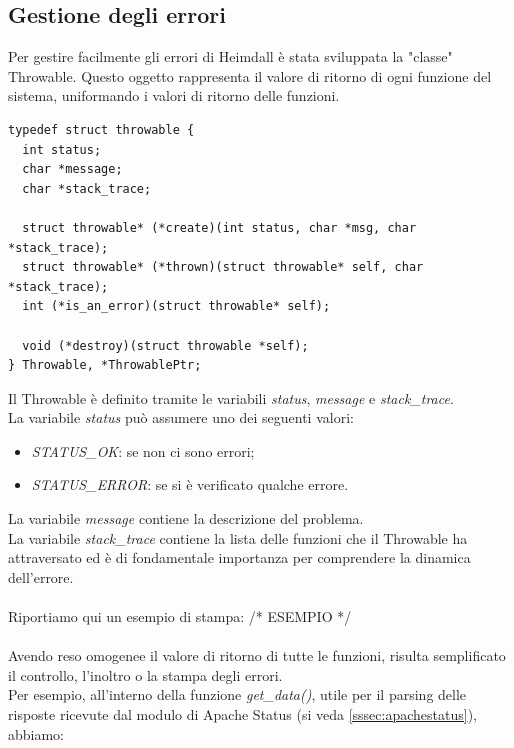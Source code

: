 \documentclass[italian]{tktltiki2}
\begin{document}
\subsection{Gestione degli errori}
\label{sec:errors}
Per gestire facilmente gli errori di Heimdall è stata sviluppata la "classe" Throwable.
Questo oggetto rappresenta il valore di ritorno di ogni funzione del sistema, uniformando i valori di ritorno delle funzioni.
\begin{lstlisting}
typedef struct throwable {
  int status;
  char *message;
  char *stack_trace;

  struct throwable* (*create)(int status, char *msg, char *stack_trace);
  struct throwable* (*thrown)(struct throwable* self, char *stack_trace);
  int (*is_an_error)(struct throwable* self);
  
  void (*destroy)(struct throwable *self);
} Throwable, *ThrowablePtr;
\end{lstlisting} 
Il Throwable è definito tramite le variabili \emph{status}, \emph{message} e \emph{stack\_trace}.
\\
La variabile \emph{status} può assumere uno dei seguenti valori:
\begin{itemize}
  \item \emph{STATUS\_OK}: se non ci sono errori;
  \item \emph{STATUS\_ERROR}: se si è verificato qualche errore.
\end{itemize}
La variabile \emph{message} contiene la descrizione del problema.
\\
La variabile \emph{stack\_trace} contiene la lista delle funzioni che il Throwable ha attraversato ed è di fondamentale importanza per comprendere la dinamica dell'errore.
\\\\
Riportiamo qui un esempio di stampa:
/* ESEMPIO */
\\\\
Avendo reso omogenee il valore di ritorno di tutte le funzioni, risulta semplificato il controllo, l'inoltro o la stampa degli errori.
\\
Per esempio, all'interno della funzione \emph{get\_data()}, utile per il parsing delle risposte ricevute dal modulo di Apache Status (si veda \ref{sssec:apachestatus}), abbiamo:
\end{document}
